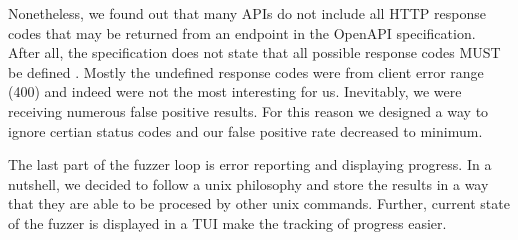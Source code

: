 Nonetheless, we found out that many APIs do not include all HTTP response codes that may be returned from an endpoint in the OpenAPI specification. After all, the specification does not state that all possible response codes MUST be defined \cite{openapi2020github}. Mostly the undefined response codes were from client error range (400) and indeed were not the most interesting for us. Inevitably, we were receiving numerous false positive results. For this reason we designed a way to ignore certian status codes and our false positive rate decreased to minimum.

The last part of the fuzzer loop is error reporting and displaying progress. In a nutshell, we decided to follow a unix philosophy and store the results in a way that they are able to be procesed by other unix commands. Further, current state of the fuzzer is displayed in a TUI make the tracking of progress easier.

